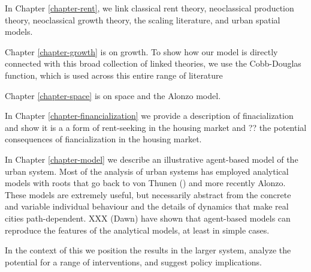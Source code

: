 In Chapter \ref{chapter-rent}, we link classical rent theory, neoclassical production theory, neoclassical growth theory, the scaling literature, and urban spatial models.

Chapter \ref{chapter-growth} is on growth. To show how our model is directly connected with this broad collection of linked theories, we use the Cobb-Douglas function, which is used across this entire range of literature 



Chapter \ref{chapter-space} is on space and the Alonzo model.

In Chapter \ref{chapter-financialization} we  provide a description of finacialization and show it is a a form of rent-seeking in the housing market and ?? the potential consequences of fiancialization in the housing market. 

In Chapter \ref{chapter-model} we  describe an illustrative agent-based model of the urban system. Most of the analysis of urban systems has employed analytical models with roots that go back to von Thunen () and more recently Alonzo. These models are extremely useful, but necessarily abstract from the concrete  and variable individual behaviour and  the details  of dynamics that make real cities path-dependent. XXX (Dawn) have shown that agent-based models can reproduce the features of the analytical models, at least in simple cases. 


In the context of this we position the results in the larger system, analyze the potential for a range of interventions, and suggest policy implications.


